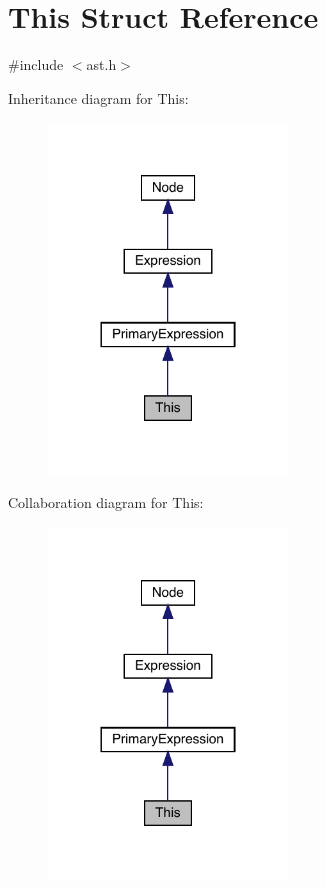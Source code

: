 \hypertarget{struct_this}{}\section{This Struct Reference}
\label{struct_this}


{\ttfamily \#include $<$ast.\+h$>$}



Inheritance diagram for This\+:
\nopagebreak
\begin{figure}[H]
\begin{center}
\leavevmode
\includegraphics[width=180pt]{struct_this__inherit__graph}
\end{center}
\end{figure}


Collaboration diagram for This\+:
\nopagebreak
\begin{figure}[H]
\begin{center}
\leavevmode
\includegraphics[width=180pt]{struct_this__coll__graph}
\end{center}
\end{figure}
